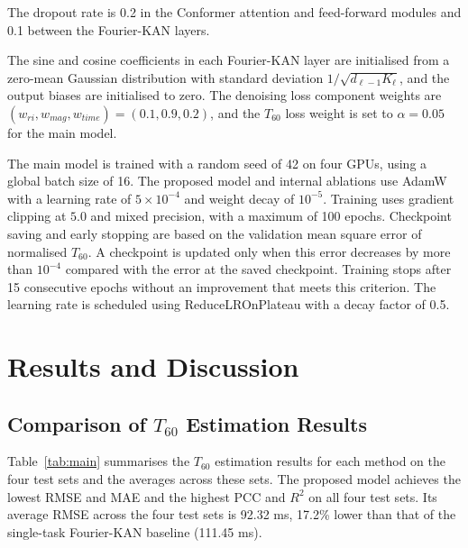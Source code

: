 \documentclass[a4paper,fleqn]{cas-sc}
\begin{document}

The dropout rate is 0.2 in the Conformer attention and feed-forward modules and 0.1 between the Fourier-KAN layers.

The sine and cosine coefficients in each Fourier-KAN layer are initialised from a zero-mean Gaussian distribution with standard deviation $1/\sqrt{d_{\ell-1}K_\ell}$, and the output biases are initialised to zero. The denoising loss component weights are $(w_{ri},w_{mag},w_{time})=(0.1,0.9,0.2)$, and the $T_{60}$ loss weight is set to $\alpha=0.05$ for the main model.



The main model is trained with a random seed of 42 on four GPUs, using a global batch size of 16. The proposed model and internal ablations use AdamW with a learning rate of $5\times10^{-4}$ and weight decay of $10^{-5}$. Training uses gradient clipping at $5.0$ and mixed precision, with a maximum of 100 epochs. Checkpoint saving and early stopping are based on the validation mean square error of normalised $T_{60}$. A checkpoint is updated only when this error decreases by more than $10^{-4}$ compared with the error at the saved checkpoint. Training stops after 15 consecutive epochs without an improvement that meets this criterion. The learning rate is scheduled using ReduceLROnPlateau with a decay factor of 0.5.



\section{Results and Discussion}
\label{sec:results}



\subsection{Comparison of $T_{60}$ Estimation Results}
\label{sec:baseline_results}



Table~\ref{tab:main} summarises the $T_{60}$ estimation results for each method on the four test sets and the averages across these sets. The proposed model achieves the lowest RMSE and MAE and the highest PCC and $R^{2}$ on all four test sets. Its average RMSE across the four test sets is 92.32 ms, 17.2\% lower than that of the single-task Fourier-KAN baseline (111.45 ms).
\end{document}
